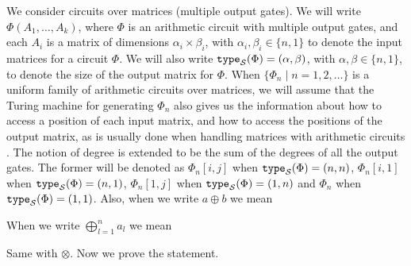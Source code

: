 
We consider circuits over matrices (multiple output gates). We will write 
$\Phi(A_1,\ldots ,A_k)$, where $\Phi$ is an arithmetic circuit with multiple output gates, and each 
$A_i$ is a matrix of dimensions $\alpha_i\times \beta_i$, with $\alpha_i,\beta_i \in \{n,1\}$ to denote 
the input matrices for a circuit $\Phi$. We will also write $\texttt{type}_{\mathcal{S}}(\Phi)=(\alpha,\beta)$, with 
$\alpha,\beta\in \{n,1\}$, to denote the size of the output matrix for $\Phi$. 
When $\{\Phi_n\mid n=1,2,\ldots\}$ is a uniform family of 
arithmetic circuits over matrices, we will assume that the Turing machine for generating $\Phi_n$ also 
gives us the information about how to access a position of each input matrix, and how to access the 
positions of the output matrix, as is usually done when handling matrices with arithmetic 
circuits \cite{Raz02}. The notion of degree is extended to be the sum of the degrees of all 
the output gates. The former will be denoted as $\Phi_{n}[i,j]$ when $\texttt{type}_{\mathcal{S}}(\Phi)=(n,n)$, 
$\Phi_{n}[i,1]$ when $\texttt{type}_{\mathcal{S}}(\Phi)=(n,1)$, $\Phi_{n}[1,j]$ when $\texttt{type}_{\mathcal{S}}(\Phi)=(1,n)$ and 
$\Phi_{n}$ when $\texttt{type}_{\mathcal{S}}(\Phi)=(1,1)$. Also, when we write $a \oplus b$ we mean 

\begin{center}
\end{center}
When we write $\bigoplus_{l=1}^n a_l$ we mean 

\begin{center}
\end{center}
Same with $\otimes$. Now we prove the statement.

